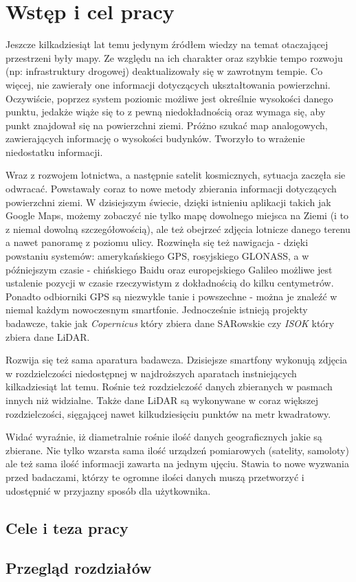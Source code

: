 \chapter{Wst\k{e}p i cel pracy}

Jeszcze kilkadziesiąt lat temu jedynym źródłem wiedzy na temat otaczającej przestrzeni były mapy.
Ze względu na ich charakter oraz szybkie tempo rozwoju (np: infrastruktury drogowej) deaktualizowały
się w zawrotnym tempie. Co więcej, nie zawierały one informacji dotyczących ukształtowania powierzchni.
Oczywiście, poprzez system poziomic możliwe jest określnie wysokości danego punktu, jedakże wiąże się to
z pewną niedokładnością oraz wymaga się, aby punkt znajdował się na powierzchni ziemi. Próżno szukać
map analogowych, zawierających informację o wysokości budynków. Tworzyło to wrażenie niedostatku informacji.

Wraz z rozwojem lotnictwa, a następnie satelit kosmicznych, sytuacja zaczęła sie odwracać. Powstawały coraz to
nowe metody zbierania informacji dotyczących powierzchni ziemi. W dzisiejszym świecie, dzięki istnieniu aplikacji
takich jak Google Maps, możemy zobaczyć nie tylko mapę dowolnego miejsca na Ziemi (i to z niemal dowolną szczegółowością),
ale też obejrzeć zdjęcia lotnicze danego terenu a nawet panoramę z poziomu ulicy. Rozwinęła się też nawigacja - dzięki powstaniu
systemów: amerykańskiego GPS, rosyjskiego GLONASS, a w późniejszym czasie - chińskiego Baidu oraz europejskiego Galileo możliwe
jest ustalenie pozycji w czasie rzeczywistym z dokładnością do kilku centymetrów. Ponadto odbiorniki GPS są niezwykle tanie i
powszechne - można je znaleźć w niemal każdym nowoczesnym smartfonie.
Jednocześnie istnieją projekty badawcze, takie jak
\textit{Copernicus}\cite{webiste:copernicus} który zbiera dane SARowskie czy \textit{ISOK}\cite{website:isok} który zbiera
dane LiDAR.

Rozwija się też sama aparatura badawcza. Dzisiejsze smartfony wykonują zdjęcia w rozdzielczości niedostępnej w najdroższych
aparatach instniejących kilkadziesiąt lat temu. Rośnie też rozdzielczość danych zbieranych w pasmach innych niż widzialne.
Także dane LiDAR są wykonywane w coraz większej rozdzielczości, sięgającej nawet kilkudziesięciu punktów na metr kwadratowy.

Widać wyraźnie, iż diametralnie rośnie ilość danych geograficznych jakie są zbierane. Nie tylko wzarsta sama ilość urządzeń
pomiarowych (satelity, samoloty) ale też sama ilość informacji zawarta na jednym ujęciu. Stawia to nowe wyzwania przed badaczami,
którzy te ogromne ilości danych muszą przetworzyć i udostępnić w przyjazny sposób dla użytkownika.

\section{Cele i teza pracy}

\section{Przegląd rozdziałów}
